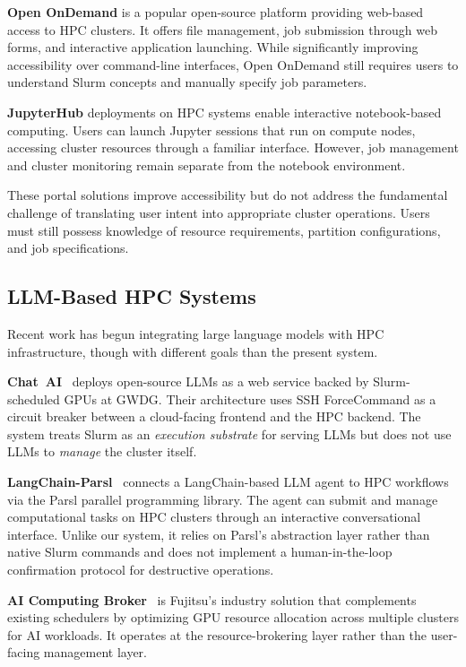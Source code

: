 \textbf{Open OnDemand} is a popular open-source platform providing web-based access to HPC clusters. It offers file management, job submission through web forms, and interactive application launching. While significantly improving accessibility over command-line interfaces, Open OnDemand still requires users to understand Slurm concepts and manually specify job parameters.

\textbf{JupyterHub} deployments on HPC systems enable interactive notebook-based computing. Users can launch Jupyter sessions that run on compute nodes, accessing cluster resources through a familiar interface. However, job management and cluster monitoring remain separate from the notebook environment.

These portal solutions improve accessibility but do not address the fundamental challenge of translating user intent into appropriate cluster operations. Users must still possess knowledge of resource requirements, partition configurations, and job specifications.

\subsection{LLM-Based HPC Systems}

Recent work has begun integrating large language models with HPC infrastructure, though with different goals than the present system.

\textbf{Chat~AI}~\cite{doosthosseini2024chatai} deploys open-source LLMs as a web service backed by Slurm-scheduled GPUs at GWDG. Their architecture uses SSH ForceCommand as a circuit breaker between a cloud-facing frontend and the HPC backend. The system treats Slurm as an \emph{execution substrate} for serving LLMs but does not use LLMs to \emph{manage} the cluster itself.

\textbf{LangChain-Parsl}~\cite{langchainparsl2025} connects a LangChain-based LLM agent to HPC workflows via the Parsl parallel programming library. The agent can submit and manage computational tasks on HPC clusters through an interactive conversational interface. Unlike our system, it relies on Parsl's abstraction layer rather than native Slurm commands and does not implement a human-in-the-loop confirmation protocol for destructive operations.

\textbf{AI Computing Broker}~\cite{fujitsu2025acb} is Fujitsu's industry solution that complements existing schedulers by optimizing GPU resource allocation across multiple clusters for AI workloads. It operates at the resource-brokering layer rather than the user-facing management layer.

